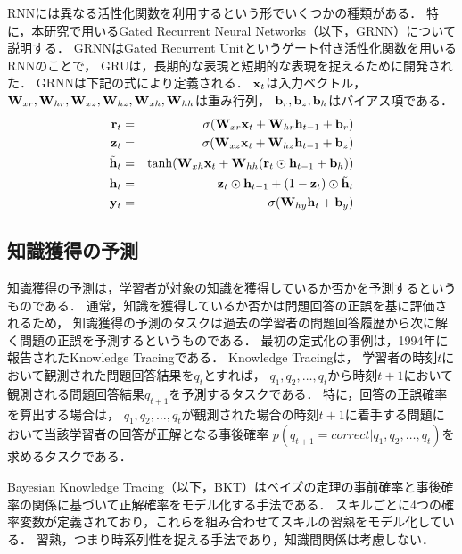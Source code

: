 \documentclass[twocolumn,a4j,10pt]{jsarticle}
\begin{document}
RNNには異なる活性化関数を利用するという形でいくつかの種類がある．
特に，本研究で用いるGated Recurrent Neural Networks（以下，GRNN）\cite{cho2014learning}について説明する．
GRNNはGated Recurrent Unit\cite{cho2014learning}というゲート付き活性化関数を用いるRNNのことで，
GRUは，長期的な表現と短期的な表現を捉えるために開発された．
GRNNは下記の式により定義される．
${\bf x}_t$は入力ベクトル，
${\bf W}_{xr}, {\bf W}_{hr}, {\bf W}_{xz}, {\bf W}_{hz}, {\bf W}_{xh}, {\bf W}_{hh}$は重み行列， 
${\bf b}_r, {\bf b}_z, {\bf b}_h$はバイアス項である．
\begin{eqnarray}
\label{eq:grurnn1}
{\bf r}_t &=& \sigma({\bf W}_{xr}{\bf x}_t + {\bf W}_{hr}{\bf h}_{t-1} + {\bf b}_r)\\
\label{eq:grurnn2}
{\bf z}_t &=& \sigma({\bf W}_{xz}{\bf x}_t + {\bf W}_{hz}{\bf h}_{t-1} + {\bf b}_z)\\
\label{eq:grurnn3}
\tilde{{\bf h}}_t &=& \tanh({\bf W}_{xh}{\bf x}_t + {\bf W}_{hh}({\bf r}_t \odot {\bf h}_{t-1} + {\bf b}_h))\\
\label{eq:grurnn4}
{\bf h}_t &=& {\bf z}_t \odot {\bf h}_{t-1} + (1 - {\bf z}_t) \odot \tilde{{\bf h}}_t\\
\label{eq:grurnn5}
{\bf y}_t &=& \sigma( {\bf W}_{hy} {\bf h}_t + {\bf b}_y)
\end{eqnarray}




\subsection{知識獲得の予測}
知識獲得の予測は，学習者が対象の知識を獲得しているか否かを予測するというものである．
通常，知識を獲得しているか否かは問題回答の正誤を基に評価されるため，
知識獲得の予測のタスクは過去の学習者の問題回答履歴から次に解く問題の正誤を予測するというものである．
最初の定式化の事例は，1994年に報告されたKnowledge Tracing\cite{corbett1994knowledge}である．
Knowledge Tracingは，
学習者の時刻$t$において観測された問題回答結果を$q_{t}$とすれば，
$q_1, q_2, \dots, q_t$から時刻$t+1$において観測される問題回答結果$q_{t+1}$を予測するタスクである．
特に，回答の正誤確率を算出する場合は，
$q_1, q_2, \dots, q_t$が観測された場合の時刻$t+1$に着手する問題において当該学習者の回答が正解となる事後確率
$p(q_{t+1} = correct|q_1, q_2, \dots, q_t)$を求めるタスクである．


Bayesian Knowledge Tracing\cite{corbett1994knowledge}（以下，BKT）はベイズの定理の事前確率と事後確率の関係に基づいて正解確率をモデル化する手法である．
スキルごとに4つの確率変数が定義されており，これらを組み合わせてスキルの習熟をモデル化している．
習熟，つまり時系列性を捉える手法であり，知識間関係は考慮しない．
 
\end{document}
